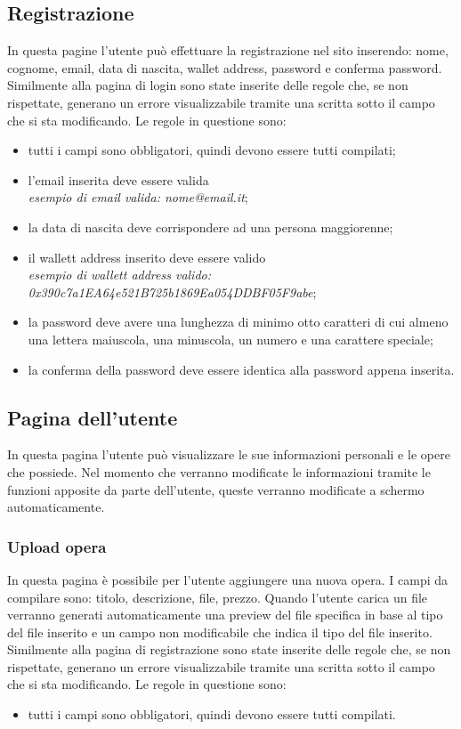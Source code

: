 \subsection{Registrazione}
In questa pagine l'utente può effettuare la registrazione nel sito inserendo: nome, cognome, email, data di nascita, wallet address, password e conferma password. Similmente alla pagina di login sono state inserite delle regole che, se non rispettate, generano un errore visualizzabile tramite una scritta sotto il campo che si sta modificando. Le regole in questione sono:
\begin{itemize}
	\item tutti i campi sono obbligatori, quindi devono essere tutti compilati;
	\item l'email inserita deve essere valida\\
	\textit{esempio di email valida: nome@email.it};
	\item la data di nascita deve corrispondere ad una persona maggiorenne;
	\item il wallett address inserito deve essere valido\\ 
	\textit{esempio di wallett address valido: 0x390c7a1EA64e521B725b1869Ea054DDBF05F9abe};
	\item la password deve avere una lunghezza di minimo otto caratteri di cui almeno una lettera maiuscola, una minuscola, un numero e una carattere speciale;
	\item la conferma della password deve essere identica alla password appena inserita.
\end{itemize}
\subsection{Pagina dell'utente}
In questa pagina l'utente può visualizzare le sue informazioni personali e le opere che possiede. Nel momento che verranno modificate le informazioni tramite le funzioni apposite da parte dell'utente, queste verranno modificate a schermo automaticamente.
\subsubsection{Upload opera}
In questa pagina è possibile per l'utente aggiungere una nuova opera. I campi da compilare sono: titolo, descrizione, file, prezzo. Quando l'utente carica un file verranno generati automaticamente una preview del file specifica in base al tipo del file inserito e un campo non modificabile che indica il tipo del file inserito. Similmente alla pagina di registrazione sono state inserite delle regole che, se non rispettate, generano un errore visualizzabile tramite una scritta sotto il campo che si sta modificando. Le regole in questione sono:
\begin{itemize}
	\item tutti i campi sono obbligatori, quindi devono essere tutti compilati.
\end{itemize}
